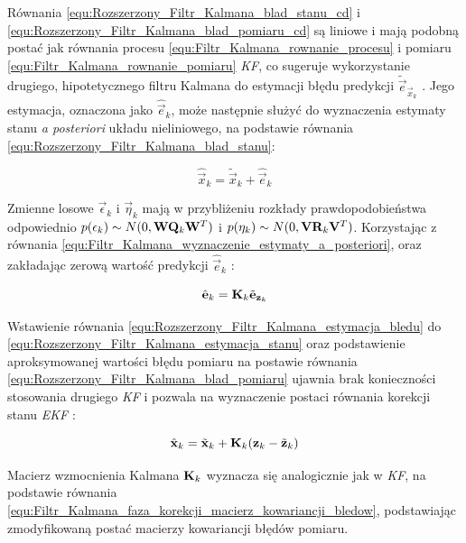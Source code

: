 Równania \ref{equ:Rozszerzony_Filtr_Kalmana_blad_stanu_cd} i \ref{equ:Rozszerzony_Filtr_Kalmana_blad_pomiaru_cd} są liniowe i mają podobną postać jak równania procesu \ref{equ:Filtr_Kalmana_rownanie_procesu} i pomiaru \ref{equ:Filtr_Kalmana_rownanie_pomiaru} \textit{KF}, co sugeruje wykorzystanie drugiego, hipotetycznego filtru Kalmana do estymacji błędu predykcji $\tilde{\vec{e}}_{\vec{x}_k}$ \cite{Welch1995}. Jego estymacja, oznaczona jako $\hat{\vec{e}}_k$, może następnie służyć do wyznaczenia estymaty stanu \textit{a posteriori} układu nieliniowego, na podstawie równania \ref{equ:Rozszerzony_Filtr_Kalmana_blad_stanu}:

\begin{equation}
\label{equ:Rozszerzony_Filtr_Kalmana_estymacja_stanu}
	\hat{\vec{x}}_k = \tilde{\vec{x}}_k + \hat{\vec{e}}_k
\end{equation}

Zmienne losowe $\vec{\epsilon}_k$ i $\vec{\eta}_k$ mają w przybliżeniu rozkłady prawdopodobieństwa odpowiednio $p(\mathbf{\epsilon}_k) \sim N(0, \mathbf{W}\mathbf{Q}_k\mathbf{W}^T)$ i $p(\mathbf{\eta}_k) \sim N(0, \mathbf{V}\mathbf{R}_k\mathbf{V}^T)$. Korzystając z równania \ref{equ:Filtr_Kalmana_wyznaczenie_estymaty_a_posteriori}, oraz zakładając zerową wartość predykcji $\hat{\vec{e}}_k$ \cite{Welch1995}:

\begin{equation}
\label{equ:Rozszerzony_Filtr_Kalmana_estymacja_bledu}
	\hat{\mathbf{e}}_k = \mathbf{K}_k \tilde{\mathbf{e}}_{\mathbf{z}_k}
\end{equation}

Wstawienie równania \ref{equ:Rozszerzony_Filtr_Kalmana_estymacja_bledu} do \ref{equ:Rozszerzony_Filtr_Kalmana_estymacja_stanu} oraz podstawienie aproksymowanej wartości błędu pomiaru na postawie równania \ref{equ:Rozszerzony_Filtr_Kalmana_blad_pomiaru} ujawnia brak konieczności stosowania drugiego \textit{KF} i pozwala na wyznaczenie postaci równania korekcji stanu \textit{EKF} \cite{Welch1995}:

\begin{equation}
\label{equ:Rozszerzony_Filtr_Kalmana_estymacja_stanu_cd}
	\hat{\mathbf{x}}_k = \tilde{\mathbf{x}}_k + \mathbf{K}_k (\mathbf{z}_k - \tilde{\mathbf{z}}_k)
\end{equation}

Macierz wzmocnienia Kalmana $\mathbf{K}_k$ wyznacza się analogicznie jak w \textit{KF}, na podstawie równania \ref{equ:Filtr_Kalmana_faza_korekcji_macierz_kowariancji_bledow}, podstawiając zmodyfikowaną postać macierzy kowariancji błędów pomiaru.

